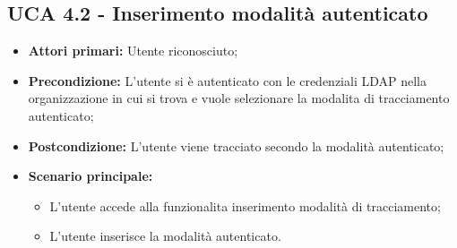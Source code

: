 \subsection{UCA 4.2 - Inserimento modalità autenticato}%
\begin{itemize}
	\item \textbf{Attori primari:} Utente riconosciuto;
	\item \textbf{Precondizione:} L'utente si è autenticato con le credenziali LDAP nella organizzazione in cui si trova e vuole selezionare la modalita di tracciamento autenticato;
	\item \textbf{Postcondizione:}  L'utente viene tracciato secondo la modalità autenticato;
	\item \textbf{Scenario principale:}
	\begin{itemize}
		\item L'utente accede alla funzionalita inserimento modalità di tracciamento;
		\item L'utente inserisce la modalità autenticato.
	\end{itemize}
\end{itemize}

